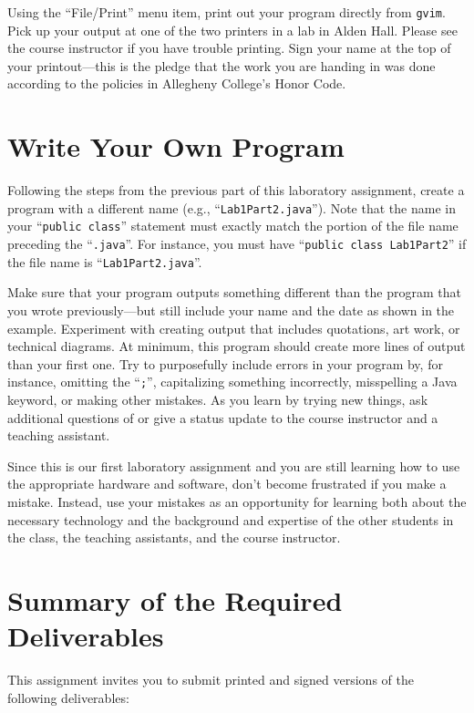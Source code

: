 \documentclass[11pt]{article}
\begin{document}
Using the ``File/Print'' menu item, print out your program directly from {\tt gvim}. Pick up your output at one of the
two printers in a lab in Alden Hall.  Please see the course instructor if you have trouble printing.  Sign your name at
the top of your printout---this is the pledge that the work you are handing in was done according to the policies in
Allegheny College's Honor Code.

\vspace*{-.15in}
\section*{Write Your Own Program}
\vspace*{-.05in}

Following the steps from the previous part of this laboratory assignment, create a program with a different name (e.g.,
``{\tt Lab1Part2.java}''). Note that the name in your ``{\tt public class}'' statement must exactly match the portion of
the file name preceding the ``{\tt .java}''.  For instance, you must have ``{\tt public class Lab1Part2}'' if the file
name is ``{\tt Lab1Part2.java}''.

Make sure that your program outputs something different than the program that you wrote previously---but still include
your name and the date as shown in the example. Experiment with creating output that includes quotations, art work, or
technical diagrams.  At minimum, this program should create more lines of output than your first one. Try to
purposefully include errors in your program by, for instance, omitting the ``{\tt ;}'', capitalizing something
incorrectly, misspelling a Java keyword, or making other mistakes. As you learn by trying new things, ask additional
questions of or give a status update to the course instructor and a teaching assistant.

Since this is our first laboratory assignment and you are still learning how to use the appropriate hardware and
software, don't become frustrated if you make a mistake. Instead, use your mistakes as an opportunity for learning both
about the necessary technology and the background and expertise of the other students in the class, the teaching
assistants, and the course instructor.

\section*{Summary of the Required Deliverables}

This assignment invites you to submit printed and signed versions of the following deliverables:
\end{document}
